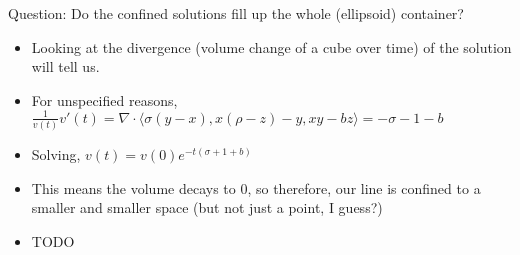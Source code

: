 \documentclass[11pt, oneside]{article}   	%
\begin{document}
Question: Do the confined solutions fill up the whole (ellipsoid) container?  
\begin{itemize}
\item Looking at the divergence (volume change of a cube over time) of the solution will tell us.
\item For unspecified reasons, $\frac{1}{v(t)}v'(t) = \nabla \cdot \langle \sigma(y-x), x(\rho - z) - y, xy-bz \rangle = -\sigma -1 - b$
\item Solving, $v(t) = v(0)e^{-t(\sigma + 1 + b)}$
\item This means the volume decays to 0, so therefore, our line is confined to a smaller and smaller space (but not just a point, I guess?)
\end{itemize}


\begin{itemize}
\item TODO
\end{itemize}
\end{document}
